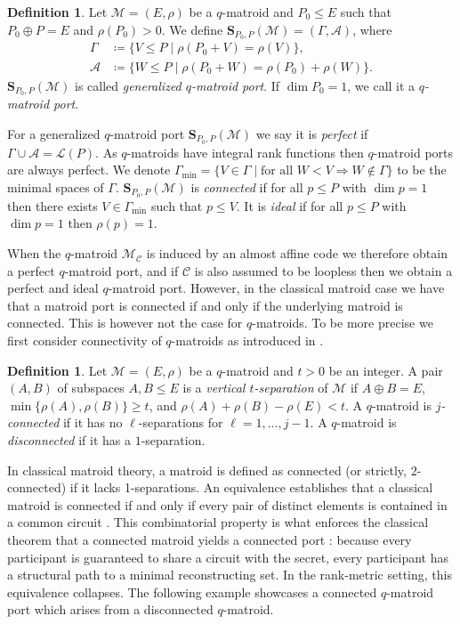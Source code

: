 \documentclass[a4paper,11pt,reqno]{article}
\renewcommand{\L}{\mathcal{L}}
\newcommand{\M}{\mathcal{M}}
\newcommand{\C}{\mathcal{C}}
\theoremstyle{plain} \numberwithin{equation}{section}
\theoremstyle{definition}
\newtheorem{definition}[theorem]{Definition}
\begin{document}
\begin{definition}
    Let $\M = (E,\rho)$ be a $q$-matroid and $P_0\leq E$ such that $P_0\oplus P =E$ and $\rho(P_0)>0$. We define $\mathbf{S}_{P_0,P}(\M) = (\Gamma,\mathcal{A})$, where
    \begin{align*}
        \Gamma &\coloneqq \{ V\leq P \mid \rho(P_0 + V) = \rho(V) \}, \\
        \mathcal{A} &\coloneqq \{W\leq P \mid \rho(P_0+W) = \rho(P_0) + \rho(W) \}.
    \end{align*}
    $\mathbf{S}_{P_0,P}(\M)$ is called \emph{generalized $q$-matroid port}. If $\dim P_0 = 1$, we call it a \emph{$q$-matroid port}.
\end{definition}

For a generalized $q$-matroid port $\mathbf{S}_{P_0,P}(\M)$ we say it is \emph{perfect} if $\Gamma \cup \mathcal{A} = \L(P)$. As $q$-matroids have integral rank functions then $q$-matroid ports are always perfect. We denote $\Gamma_{\min} = \{ V\in \Gamma \mid \text{for all }W<V\Rightarrow W\notin \Gamma\}$ to be the minimal spaces of $\Gamma$. $\mathbf{S}_{P_0,P}(\M)$ is \emph{connected} if for all $p\leq P$ with $\dim p = 1$ then there exists $V\in \Gamma_{\min}$ such that $p\leq V$. It is \emph{ideal} if for all $p\leq P$ with $\dim p = 1$ then $\rho(p) =1$.

When the $q$-matroid $\M_\C$ is induced by an almost affine code we therefore obtain a perfect $q$-matroid port, and if $\C$ is also assumed to be loopless then we obtain a perfect and ideal $q$-matroid port. However, in the classical matroid case we have that a matroid port is connected if and only if the underlying matroid is connected. This is however not the case for $q$-matroids. To be more precise we first consider connectivity of $q$-matroids as introduced in \cite{conca2026intersectingcodesconnectivityqmatroids}.

\begin{definition}
    Let $\M = (E,\rho)$ be a $q$-matroid and $t>0$ be an integer. A pair $(A,B)$ of subspaces $A,B\leq E$ is a \emph{vertical $t$-separation} of $\M$ if $A\oplus B = E$, $\min\{\rho(A),\rho(B)\}\geq t$, and $\rho(A) + \rho(B) - \rho(E) <t$. A $q$-matroid is \emph{$j$-connected} if it has no $\ell$-separations for $\ell=1,\ldots,j-1$. A $q$-matroid is \emph{disconnected} if it has a $1$-separation.
\end{definition}

In classical matroid theory, a matroid is defined as connected (or strictly, 2-connected) if it lacks 1-separations. An equivalence establishes that a classical matroid is connected if and only if every pair of distinct elements is contained in a common circuit \cite{Oxley}. This combinatorial property is what enforces the classical theorem that a connected matroid yields a connected port \cite{Lehman}: because every participant is guaranteed to share a circuit with the secret, every participant has a structural path to a minimal reconstructing set. In the rank-metric setting, this equivalence collapses. The following example showcases a connected $q$-matroid port which arises from a disconnected $q$-matroid.
\end{document}
